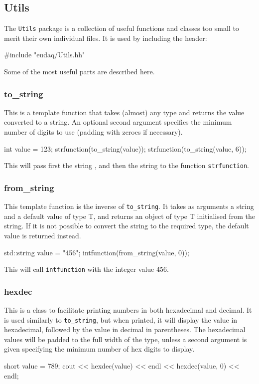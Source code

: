\subsection{Utils}
The \texttt{Utils} package is a collection of useful functions and classes too small to merit
their own individual files.
It is used by including the header:
\begin{listing}
#include "eudaq/Utils.hh"
\end{listing}

Some of the most useful parts are described here.

\subsubsection{to\_string}
This is a template function that takes (almost) any type and returns the value converted to a string.
An optional second argument specifies the minimum number of digits to use
(padding with zeroes if necessary).
\begin{listing}
int value = 123;
strfunction(to_string(value));
strfunction(to_string(value, 6));
\end{listing}

This will pass first the string ,
and then the string 
to the function \texttt{strfunction}.

\subsubsection{from\_string}
This template function is the inverse of \texttt{to\_string}.
It takes as arguments a string and a default value of type T,
and returns an object of type T initialised from the string.
If it is not possible to convert the string to the required type,
the default value is returned instead.
\begin{listing}
std::string value = "456";
intfunction(from_string(value, 0));
\end{listing}

This will call \texttt{intfunction} with the integer value 456.

\subsubsection{hexdec}
This is a class to facilitate printing numbers in both hexadecimal and decimal.
It is used similarly to \texttt{to\_string}, but when printed,
it will display the value in hexadecimal, followed by the value in decimal in parentheses.
The hexadecimal values will be padded to the full width of the type,
unless a second argument is given specifying the minimum number of hex digits to display.
\begin{listing}
short value = 789;
cout << hexdec(value) << endl
     << hexdec(value, 0) << endl;
\end{listing}

